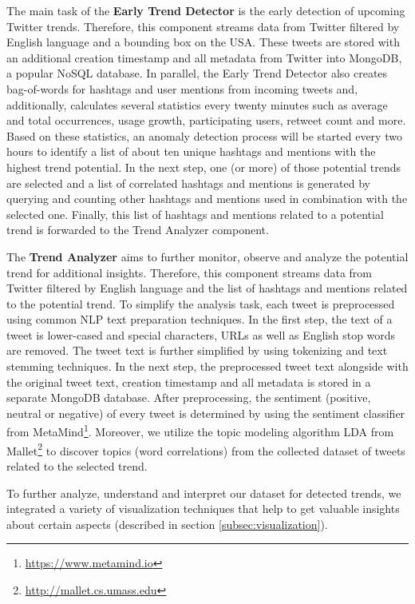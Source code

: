 The main task of the \textbf{Early Trend Detector} is the early detection of upcoming Twitter trends. Therefore, this component streams data from Twitter filtered by English language and a bounding box on the USA. These tweets are stored with an additional creation timestamp and all metadata from Twitter into MongoDB, a popular NoSQL database. In parallel, the Early Trend Detector also creates bag-of-words for hashtags and user mentions from incoming tweets and, additionally, calculates several statistics every twenty minutes such as average and total occurrences, usage growth, participating users, retweet count and more. Based on these statistics, an anomaly detection process will be started every two hours to identify a list of about ten unique hashtags and mentions with the highest trend potential. In the next step, one (or more) of those potential trends are selected and a list of correlated hashtags and mentions is generated by querying and counting other hashtags and mentions used in combination with the selected one. Finally, this list of hashtags and mentions related to a potential trend is forwarded to the Trend Analyzer component.

The \textbf{Trend Analyzer} aims to further monitor, observe and analyze the potential trend for additional insights. Therefore, this component streams data from Twitter filtered by English language and the list of hashtags and mentions related to the potential trend. To simplify the analysis task, each tweet is preprocessed using common NLP text preparation techniques. In the first step, the text of a tweet is lower-cased and special characters, URLs as well as English stop words are removed. The tweet text is further simplified by using tokenizing and text stemming techniques. In the next step, the preprocessed tweet text alongside with the original tweet text, creation timestamp and all metadata is stored in a separate MongoDB database. After preprocessing, the sentiment (positive, neutral or negative) of every tweet is determined by using the sentiment classifier from MetaMind\footnote{\url{https://www.metamind.io} \accessednote}. Moreover, we utilize the topic modeling algorithm LDA from Mallet\footnote{\url{http://mallet.cs.umass.edu} \accessednote} to discover topics (word correlations) from the collected dataset of tweets related to the selected trend. 

To further analyze, understand and interpret our dataset for detected trends, we integrated a variety of visualization techniques that help to get valuable insights about certain aspects (described in section \ref{subsec:visualization}). 